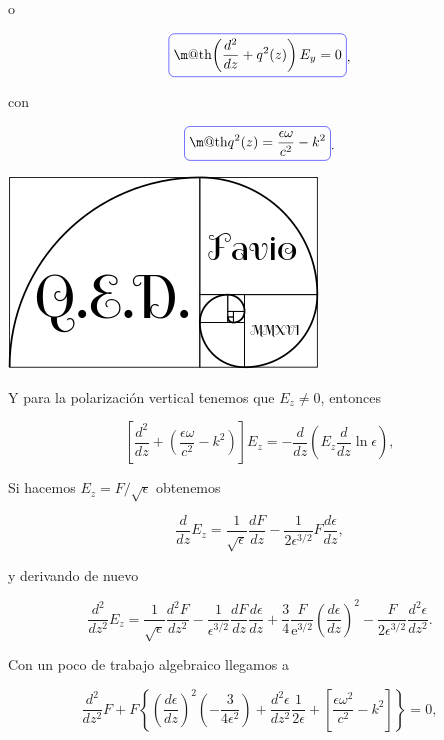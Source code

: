 \documentclass[a4paper,11pt]{article}
\makeatletter
\numberwithin{equation}{section}
\newcommand*{\boxcolor}{blue}
\renewcommand{\boxed}[1]{\textcolor{\boxcolor}{%
\tikz[baseline={([yshift=-1ex]current bounding box.center)}] \node [rectangle, minimum width=1ex,rounded corners,draw] {\normalcolor\m@th$\displaystyle#1$};}}
\newcommand{\euler}{\mathrm{e}}
\makeatother
\begin{document}
o 

\begin{equation}
 \boxed{\left(\frac{d^2}{dz} + q^2(z) \right) E_y = 0},
\end{equation}

con 

\begin{equation}
 \boxed{q^2(z) = \frac{\epsilon \omega}{c^2} - k^2}.
\end{equation}

\hspace{10cm}\includegraphics[scale=0.25]{logoQED}

Y para la polarización vertical tenemos que $E_z \ne 0$, entonces 

\begin{equation}
  \left[ \frac{d^2}{dz}  + \left(\frac{\epsilon \omega}{c^2} - k^2 \right)\right] E_z 
 = - \frac{d}{dz}\left(E_z \frac{d}{dz} \ln{\epsilon} \right),
\end{equation}

Si hacemos $E_z = F/\sqrt{\epsilon}$ obtenemos 

\begin{equation}
 \frac{d}{dz} E_z = \frac{1}{\sqrt{\epsilon}} \frac{d F}{dz} 
 - \frac{1}{2 \epsilon^{3/2}} F \frac{d\epsilon}{dz},
\end{equation}

y derivando de nuevo 

\begin{equation}
 \frac{d^2}{dz^2} E_z = \frac{1}{\sqrt{\epsilon}} \frac{d^2 F}{dz^2} - 
 \frac{1}{\epsilon^{3/2}}\frac{dF}{dz}\frac{d\epsilon}{dz} + 
 \frac{3}{4} \frac{F}{\euler^{3/2}} \left(\frac{d\epsilon}{dz} \right)^2 
 - \frac{F}{2\epsilon^{3/2}} \frac{d^2 \epsilon}{dz^2}.
\end{equation}

Con un poco de trabajo algebraico llegamos a 

\begin{equation}
 \frac{d^2}{dz^2} F + F \left\{\left(\frac{d\epsilon}{dz} \right)^2 
 \left(- \frac{3}{4\epsilon^2}\right) + \frac{d^2 \epsilon}{dz^2} 
 \frac{1}{2\epsilon} + \left[\frac{\epsilon\omega^2}{c^2} - k^2\right]\right\} = 0,
\end{equation}
\end{document}
